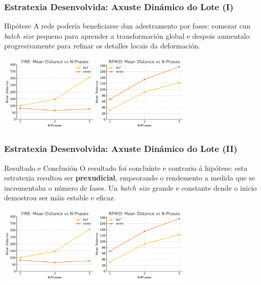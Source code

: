 \documentclass[xcolor=dvipsnames]{beamer}
\begin{document}
\begin{frame}
    \frametitle{Estratexia Desenvolvida: Axuste Dinámico do Lote (I)}
    
    \begin{block}{Hipótese}
        A rede podería beneficiarse dun adestramento por fases: comezar cun \textit{batch size} pequeno para aprender a transformación global e despois aumentalo progresivamente para refinar os detalles locais da deformación.
    \end{block}
        \vspace{0.5cm}

    \centering
    \includegraphics[width=0.7\textwidth]{../imaxes/lottery/nphases.png}
    
\end{frame}

\begin{frame}
    \frametitle{Estratexia Desenvolvida: Axuste Dinámico do Lote (II)}
        \begin{alertblock}{Resultado e Conclusión}
        O resultado foi concluínte e contrario á hipótese: esta estratexia resultou ser \textbf{prexudicial}, empeorando o rendemento a medida que se incrementaba o número de fases. Un \textit{batch size} grande e constante dende o inicio demostrou ser máis estable e eficaz.
    \end{alertblock}
    \vspace{0.5cm}
    \centering
    \includegraphics[width=0.7\textwidth]{../imaxes/lottery/nphases.png}
    


\end{frame}
\end{document}
